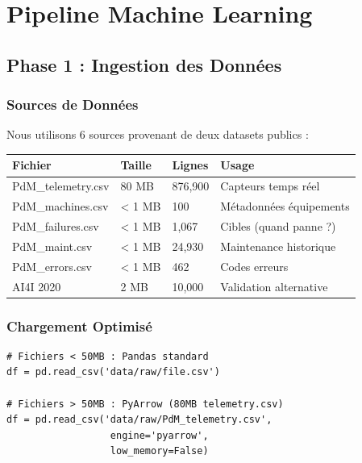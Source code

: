 \documentclass[12pt,a4paper,french]{article}
\begin{document}
\section{Pipeline Machine Learning}

\subsection{Phase 1 : Ingestion des Données}

\subsubsection{Sources de Données}

Nous utilisons 6 sources provenant de deux datasets publics :

\begin{table}[H]
\centering
\small
\begin{tabular}{|l|l|l|l|}
\hline
\textbf{Fichier} & \textbf{Taille} & \textbf{Lignes} & \textbf{Usage} \\
\hline
PdM\_telemetry.csv & 80 MB & 876,900 & Capteurs temps réel \\
PdM\_machines.csv & < 1 MB & 100 & Métadonnées équipements \\
PdM\_failures.csv & < 1 MB & 1,067 & Cibles (quand panne ?) \\
PdM\_maint.csv & < 1 MB & 24,930 & Maintenance historique \\
PdM\_errors.csv & < 1 MB & 462 & Codes erreurs \\
AI4I 2020 & 2 MB & 10,000 & Validation alternative \\
\hline
\end{tabular}
\end{table}

\subsubsection{Chargement Optimisé}

\begin{lstlisting}
# Fichiers < 50MB : Pandas standard
df = pd.read_csv('data/raw/file.csv')

# Fichiers > 50MB : PyArrow (80MB telemetry.csv)
df = pd.read_csv('data/raw/PdM_telemetry.csv', 
                  engine='pyarrow',
                  low_memory=False)
\end{lstlisting}
\end{document}
